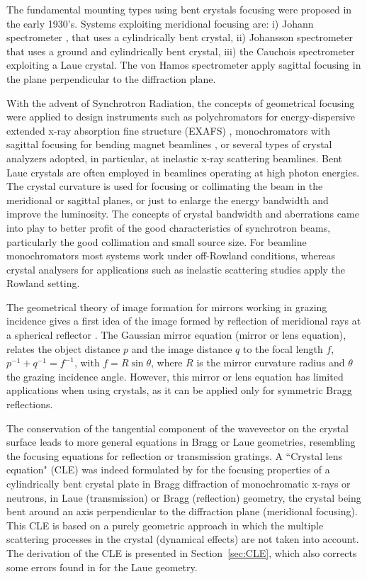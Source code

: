 \documentclass[preprint]{iucr}              %
\begin{document}
The fundamental mounting types using bent crystals focusing were proposed in the early 1930’s. Systems exploiting meridional focusing are: i) Johann spectrometer \cite{Johann1931}, that uses a cylindrically bent crystal,  ii) Johansson spectrometer \cite{Johansson1933} that uses a ground and cylindrically bent crystal, iii) the Cauchois spectrometer \cite{cauchois1933} exploiting a Laue crystal. The von Hamos spectrometer \cite{V.Hamos1933} apply sagittal focusing in the plane perpendicular to the diffraction plane.

With the advent of Synchrotron Radiation, the concepts of geometrical focusing were applied to design instruments such as polychromators for energy-dispersive extended x-ray absorption fine structure (EXAFS) \cite{Tolentino:ms0206}, monochromators with sagittal focusing for bending magnet beamlines \cite{Sparks1980}, or several types of crystal analyzers adopted, in particular, at inelastic x-ray scattering beamlines. Bent Laue crystals are often employed in beamlines operating at high photon energies. The crystal curvature is used for focusing or collimating the beam in the meridional \cite{Suortti1988} or sagittal \cite{Zhong2001} planes, or just to enlarge the energy bandwidth and improve the luminosity. The concepts of crystal bandwidth and aberrations came into play to better profit of the good characteristics of synchrotron beams, particularly the good collimation and small source size. For beamline monochromators  most systems work under off-Rowland conditions, whereas crystal analysers for applications such as inelastic scattering studies apply the Rowland setting.

The geometrical theory of image formation for mirrors working in grazing incidence gives a first idea of the image formed by reflection of meridional rays at a spherical reflector \cite{KB1948}. The Gaussian mirror equation (mirror or lens equation), relates the object distance $p$ and the image distance $q$ to the focal length $f$, $p^{-1}+q^{-1}=f^{-1}$, with $f=R \sin\theta$, where $R$ is the mirror curvature radius and $\theta$ the grazing incidence angle. However, this mirror or lens equation has limited applications when using crystals, as it can be applied only for symmetric Bragg reflections.

The conservation of the tangential component of the wavevector on the crystal surface leads to more general equations in Bragg or Laue geometries, resembling the focusing equations for reflection or transmission gratings.
A ``Crystal lens equation" (CLE) was indeed formulated by \cite{CK} for the focusing properties of a cylindrically bent crystal plate in Bragg diffraction of monochromatic x-rays or neutrons, in Laue (transmission) or Bragg (reflection) geometry, the crystal being bent around an axis perpendicular to the diffraction plane (meridional focusing). This CLE is based on a purely geometric approach in which the multiple scattering processes in the crystal (dynamical effects) are not taken into account. 
The derivation of the CLE is presented in Section~\ref{sec:CLE}, which also corrects
some errors found in \cite{CK} for the Laue geometry.
\end{document}
